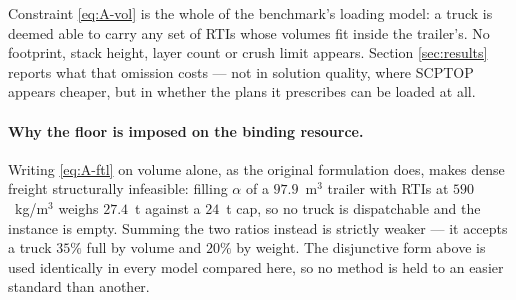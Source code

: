 Constraint \eqref{eq:A-vol} is the whole of the benchmark's loading model: a
truck is deemed able to carry any set of RTIs whose volumes fit inside the
trailer's. No footprint, stack height, layer count or crush limit appears.
Section \ref{sec:results} reports what that omission costs --- not in solution
quality, where SCPTOP appears cheaper, but in whether the plans it prescribes
can be loaded at all.

\paragraph{Why the floor is imposed on the binding resource.}
Writing \eqref{eq:A-ftl} on volume alone, as the original formulation does,
makes dense freight structurally infeasible: filling $\alpha$ of a $97.9$~m$^3$
trailer with RTIs at $590$~kg/m$^3$ weighs $27.4$~t against a $24$~t cap, so no
truck is dispatchable and the instance is empty. Summing the two ratios
instead is strictly weaker --- it accepts a truck $35\%$ full by volume and
$20\%$ by weight. The disjunctive form above is used identically in every model
compared here, so no method is held to an easier standard than another.

\endgroup
